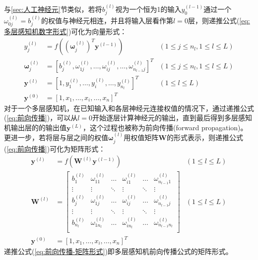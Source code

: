 \documentclass[a4paper]{ctexart}
\begin{document}
\begin{spacing}{1.3}
	与\ref{sec:人工神经元}节类似，若将$b_j^{(l)}$视为一个恒为1的输入$y_0^{(l-1)}$通过一个$\omega_{0j}^{(l)}=b_j^{(l)}$的权值与神经元相连，并且将输入层看作第$l=0$层，则递推公式(\ref{eq:多层感知机数字形式})可化为向量形式：
	\begin{equation}\label{eq:前向传播}
		\begin{aligned}
			y_j^{(l)}&=f\left((\bm{\omega}_{j}^{(l)})^T\bm{y}^{(l-1)}\right)&(1\leq j\leq n_l,1\leq l\leq L)\\
			\bm{\omega}_{j}^{(l)}&=\left[b_j^{(l)},\omega_{1j}^{(l)},\dots,\omega_{ij}^{(l)},\dots,\omega_{n_{l-1}j}^{(l)}\right]^T&(1\leq j\leq n_l,1\leq l\leq L)\\
			\bm{y}^{(l)}&=\left[1,y_1^{(l)},\dots,y_i^{(l)},\dots,y_{n_l}^{(l)}\right]^T&(1\leq l\leq L)\\
			\bm{y}^{(0)}&=\left[1,x_1,\dots,x_i,\dots,x_n\right]^T
		\end{aligned}
	\end{equation}
	对于一个多层感知机，在已知输入和各层神经元连接权值的情况下，通过递推公式(\ref{eq:前向传播})，可以从$l=0$开始逐层计算神经元的输出，直到最后得到多层感知机输出层的的输出值$\bm{y}^{(L)}$，这个过程也被称为前向传播(forward propagation)\cite{RN119}。更进一步，若将层与层之间的权值$\bm{\omega}_{j}^{(l)}$用权值矩阵$\bm{W}$的形式表示，则递推公式(\ref{eq:前向传播})可化为矩阵形式：
	\begin{equation}\label{eq:前向传播-矩阵形式}
		\begin{aligned}
			\bm{y}^{(l)}&=f\left(\bm{W}^{(l)}\bm{y}^{(l-1)}\right)&(1\leq l\leq L)\\
			\bm{W}^{(l)}&=
			\begin{bmatrix}
				b_1^{(l)}&\omega_{11}^{(l)}&\dots&\omega_{i1}^{(l)}&\dots&\omega_{n_{l-1}1}^{(l)}\\
				\vdots&\vdots&\ddots&\vdots&\ddots&\vdots\\
				b_j^{(l)}&\omega_{1j}^{(l)}&\dots&\omega_{ij}^{(l)}&\dots&\omega_{n_{l-1}j}^{(l)}\\
				\vdots&\vdots&\ddots&\vdots&\ddots&\vdots\\
				b_{n_l}^{(l)}&\omega_{1n_l}^{(l)}&\dots&\omega_{in_l}^{(l)}&\dots&\omega_{n_{l-1}n_{l}}^{(l)}\\
			\end{bmatrix}&(1\leq l\leq L)\\
			\bm{y}^{(0)}&=\left[1,x_1,\dots,x_i,\dots,x_n\right]^T
		\end{aligned}
	\end{equation}
	递推公式(\ref{eq:前向传播-矩阵形式})即多层感知机前向传播公式的矩阵形式。


\end{spacing}
\end{document}
